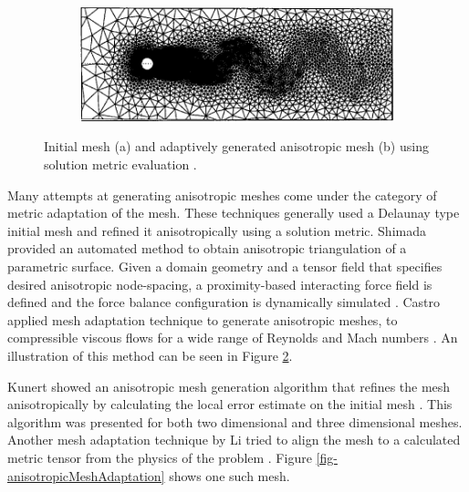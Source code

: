 \begin{figure}
\begin{minipage}[b]{.55\textwidth}
\begin{subfigure}{\linewidth}
		\includegraphics[width=\linewidth]{img/intro/lit/castro.png}
		\caption{}
	\label{fig-castro}
	\end{subfigure}
	\caption{Initial mesh (a) and adaptively generated anisotropic mesh (b) using solution metric evaluation	\cite{castro1997anisotropic}.}
\end{minipage}
\end{figure}

Many attempts at generating anisotropic meshes come under the category of metric adaptation of the mesh. These techniques generally used a Delaunay type initial mesh and refined it anisotropically using a solution metric. Shimada \etal provided an automated method to obtain anisotropic triangulation of a parametric surface. Given a domain geometry and a tensor field that specifies desired anisotropic node-spacing, a proximity-based interacting force field is defined and the force balance configuration is dynamically simulated \cite{shimada1997anisotropic}. Castro \etal applied mesh adaptation technique to generate anisotropic meshes, to compressible viscous flows for a wide range of Reynolds and Mach numbers \cite{castro1997anisotropic}. An illustration of this method can be seen in Figure \ref{fig-castro}. 

Kunert \etal showed an anisotropic mesh generation algorithm that refines the mesh anisotropically by calculating the local error estimate on the initial mesh \cite{kunert2002toward}. This algorithm was presented for both two dimensional and three dimensional meshes. Another mesh adaptation technique by Li \etal tried to align the mesh to a calculated metric tensor from the physics of the problem \cite{li2010anisotropic}. Figure \ref{fig-anisotropicMeshAdaptation} shows one such mesh.

